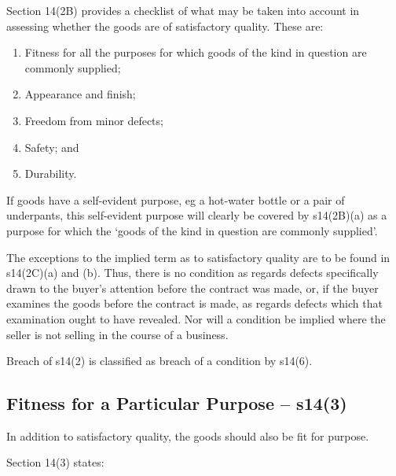 \documentclass[
]{article}
\providecommand{\tightlist}{%
  \setlength{\itemsep}{0pt}\setlength{\parskip}{0pt}}
\begin{document}
Section 14(2B) provides a checklist of what may be taken into account in
assessing whether the goods are of satisfactory quality. These are:

\begin{enumerate}
\def\labelenumi{\arabic{enumi}.}
\tightlist
\item
  Fitness for all the purposes for which goods of the kind in question
  are commonly supplied;
\item
  Appearance and finish;
\item
  Freedom from minor defects;
\item
  Safety; and
\item
  Durability.
\end{enumerate}

If goods have a self-evident purpose, eg a hot-water bottle or a pair of
underpants, this self-evident purpose will clearly be covered by
s14(2B)(a) as a purpose for which the `goods of the kind in question are
commonly supplied'.

The exceptions to the implied term as to satisfactory quality are to be
found in s14(2C)(a) and (b). Thus, there is no condition as regards
defects specifically drawn to the buyer's attention before the contract
was made, or, if the buyer examines the goods before the contract is
made, as regards defects which that examination ought to have revealed.
Nor will a condition be implied where the seller is not selling in the
course of a business.

Breach of s14(2) is classified as breach of a condition by s14(6).

\hypertarget{fitness-for-a-particular-purpose-s143}{%
\subsection{Fitness for a Particular Purpose --
s14(3)}\label{fitness-for-a-particular-purpose-s143}}

In addition to satisfactory quality, the goods should also be fit for
purpose.

Section 14(3) states:
\end{document}
